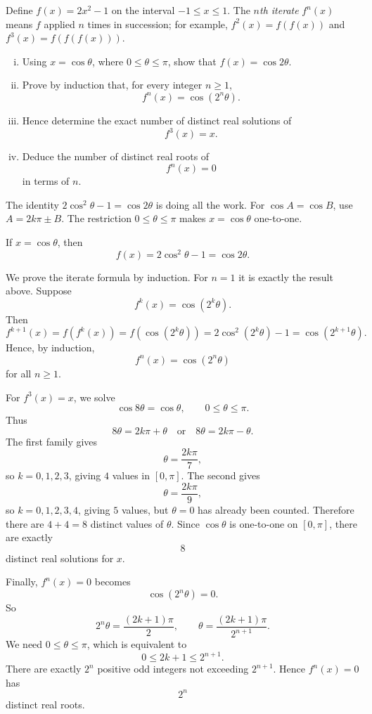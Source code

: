 
\begin{problem}
Define $f(x)=2x^2-1$ on the interval $-1\le x\le1$. The \emph{$n$th iterate}
$f^n(x)$ means $f$ applied $n$ times in succession; for example,
$f^2(x)=f(f(x))$ and $f^3(x)=f(f(f(x)))$.

\begin{enumerate}[(i)]
  \item Using $x=\cos\theta$, where $0\le\theta\le\pi$, show that
        $f(x)=\cos2\theta$.
  \item Prove by induction that, for every integer $n\ge1$,
        \[
        f^n(x)=\cos(2^n\theta).
        \]
  \item Hence determine the exact number of distinct real solutions of
        \[
        f^3(x)=x.
        \]
  \item Deduce the number of distinct real roots of
        \[
        f^n(x)=0
        \]
        in terms of $n$.
\end{enumerate}
\end{problem}

\begin{hintbox}
The identity $2\cos^2\theta-1=\cos2\theta$ is doing all the work. For
$\cos A=\cos B$, use $A=2k\pi\pm B$. The restriction $0\le\theta\le\pi$ makes
$x=\cos\theta$ one-to-one.
\end{hintbox}

\begin{solution}
If $x=\cos\theta$, then
\[
f(x)=2\cos^2\theta-1=\cos2\theta.
\]

We prove the iterate formula by induction. For $n=1$ it is exactly the result
above. Suppose
\[
f^k(x)=\cos(2^k\theta).
\]
Then
\[
f^{k+1}(x)
=f(f^k(x))
=f(\cos(2^k\theta))
=2\cos^2(2^k\theta)-1
=\cos(2^{k+1}\theta).
\]
Hence, by induction,
\[
f^n(x)=\cos(2^n\theta)
\]
for all $n\ge1$.

For $f^3(x)=x$, we solve
\[
\cos8\theta=\cos\theta,
\qquad 0\le\theta\le\pi.
\]
Thus
\[
8\theta=2k\pi+\theta
\quad\text{or}\quad
8\theta=2k\pi-\theta.
\]
The first family gives
\[
\theta=\frac{2k\pi}{7},
\]
so $k=0,1,2,3$, giving $4$ values in $[0,\pi]$. The second gives
\[
\theta=\frac{2k\pi}{9},
\]
so $k=0,1,2,3,4$, giving $5$ values, but $\theta=0$ has already been counted.
Therefore there are $4+4=8$ distinct values of $\theta$. Since $\cos\theta$ is
one-to-one on $[0,\pi]$, there are exactly
\[
\boxed{8}
\]
distinct real solutions for $x$.

Finally, $f^n(x)=0$ becomes
\[
\cos(2^n\theta)=0.
\]
So
\[
2^n\theta=\frac{(2k+1)\pi}{2},
\qquad
\theta=\frac{(2k+1)\pi}{2^{n+1}}.
\]
We need $0\le\theta\le\pi$, which is equivalent to
\[
0\le 2k+1\le 2^{n+1}.
\]
There are exactly $2^n$ positive odd integers not exceeding $2^{n+1}$. Hence
$f^n(x)=0$ has
\[
\boxed{2^n}
\]
distinct real roots.
\end{solution}

